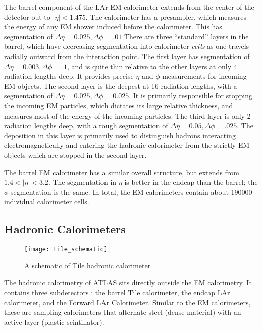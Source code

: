 The barrel component of the LAr EM calorimeter extends from the center of the detector out to $| \eta| <  1.475 $.
The calorimeter has a presampler, which measures the energy of any EM shower induced before the calorimeter.
This has segmentation of $\Delta\eta = 0.025, \Delta\phi = .01$
There are three ``standard'' layers in the barrel, which have decreasing segmentation into calorimeter \textit{cells} as one travels radially outward from the interaction point.
The first layer has segmentation of $\Delta\eta = 0.003, \Delta\phi = .1$, and is quite thin relative to the other layers at only 4 radiation lengths deep.
It provides precise $\eta$ and $\phi$ measurements for incoming EM objects.
The second layer is the deepest at 16 radiation lengths, with a segmentation of $\Delta\eta = 0.025, \Delta\phi = 0.025$.
It is primarily responsible for stopping the incoming EM particles, which dictates its large relative thickness, and measures most of the energy of the incoming particles.
The third layer is only 2 radiation lengths deep, with a rough segmentation of $\Delta\eta = 0.05, \Delta\phi = .025$.
The deposition in this layer is primarily used to distinguish hadrons interacting electromagnetically and entering the hadronic calorimeter from the strictly EM objects which are stopped in the second layer.

The barrel EM calorimeter has a similar overall structure, but extends from $1.4 < |\eta| < 3.2$.
The segmentation in $\eta$ is better in the endcap than the barrel; the $\phi$ segmentation is the same.
In total, the EM calorimeters contain about 190000 individual calorimeter cells.


\subsection{Hadronic Calorimeters}
\begin{figure}
\caption{A schematic of Tile hadronic calorimeter} \label{fig:tile_schematic}
\texttt{[image: tile\_schematic]}
\end{figure}

The hadronic calorimetry of ATLAS sits directly outside the EM calorimetry.
It contains three subdetectors : the barrel Tile calorimeter, the endcap LAr calorimeter, and the Forward  LAr Calorimeter.
Similar to the EM calorimeters, these are sampling calorimeters that alternate steel (dense material) with an active layer (plastic scintillator).

